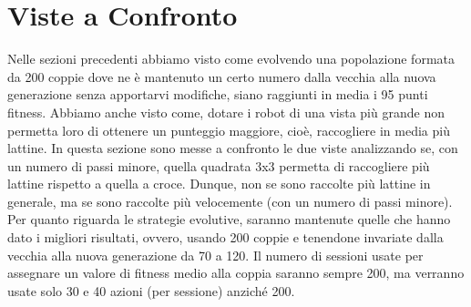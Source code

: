 \section{Viste a Confronto}
Nelle sezioni precedenti abbiamo visto come evolvendo una popolazione formata da
200 coppie dove ne è mantenuto un certo numero dalla vecchia alla nuova
generazione senza apportarvi modifiche, siano raggiunti in media i 95 punti
fitness. Abbiamo anche visto come, dotare i robot di una vista più grande non
permetta loro di ottenere un punteggio maggiore, cioè, raccogliere in media più
lattine.\newline
In questa sezione sono messe a confronto le due viste analizzando se, con un
numero di passi minore, quella quadrata 3x3 permetta di raccogliere più lattine
rispetto a quella a croce. Dunque, non se sono raccolte più lattine in generale,
ma se sono raccolte più velocemente (con un numero di passi minore).\newline
Per quanto riguarda le strategie evolutive, saranno mantenute quelle che hanno
dato i migliori risultati, ovvero, usando 200 coppie e tenendone invariate dalla
vecchia alla nuova generazione da 70 a 120. Il numero di sessioni usate per
assegnare un valore di fitness medio alla coppia saranno sempre 200, ma verranno
usate solo 30 e 40 azioni (per sessione) anziché 200.

